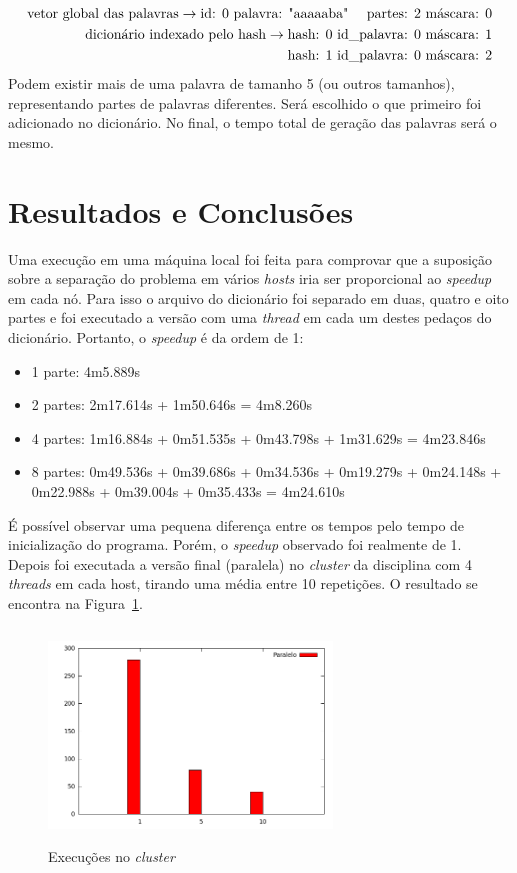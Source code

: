 \documentclass[a4paper]{article}
\begin{document}
\begin{eqnarray*}
	\textrm{vetor global das palavras} \rightarrow \textrm{id: 0 palavra: "aaaaaba" \quad partes: 2 máscara: 0}\\
	\textrm{dicionário indexado pelo hash} \rightarrow \textrm{hash: 0 id\_palavra: 0 máscara: 1}\\
					 \textrm{hash: 1 id\_palavra: 0 máscara: 2}\\
\end{eqnarray*}	
\indent Podem existir mais de uma palavra de tamanho 5 (ou outros tamanhos), representando partes de palavras diferentes. Será escolhido o que primeiro foi adicionado no dicionário. No final, o tempo total de geração das palavras será o mesmo.
	
\section{Resultados e Conclusões}
\indent \indent Uma execução em uma máquina local foi feita para comprovar que a suposição sobre a separação do problema em vários \emph{hosts} iria ser proporcional ao \emph{speedup} em cada nó. Para isso o arquivo do dicionário foi separado em duas, quatro e oito partes e foi executado a versão com uma \emph{thread} em cada um destes pedaços do dicionário. Portanto, o \emph{speedup} é da ordem de 1:	
\begin{itemize}
	\item 1 parte: 4m5.889s
	\item 2 partes: 2m17.614s + 1m50.646s = 4m8.260s
	\item 4 partes: 1m16.884s + 0m51.535s + 0m43.798s + 1m31.629s = 4m23.846s
	\item 8 partes: 0m49.536s + 0m39.686s + 0m34.536s + 0m19.279s + 0m24.148s + 0m22.988s + 0m39.004s + 0m35.433s = 4m24.610s
\end{itemize}
\indent É possível observar uma pequena diferença entre os tempos pelo tempo de inicialização do programa. Porém, o \emph{speedup} observado foi realmente de 1.\\
\indent Depois foi executada a versão final (paralela) no \emph{cluster} da disciplina com 4 \emph{threads} em cada host, tirando uma média entre 10 repetições. O resultado se encontra na Figura~\ref{pic-graph}.\\
\begin{figure}[float=h!]
	\centerline{\includegraphics[width=285px, height=215px]{graph}}
	\caption{Execuções no \emph{cluster}}
	\label{pic-graph}
\end{figure}
\end{document}
